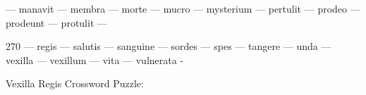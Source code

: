 \documentclass[12pt]{article}
\begin{document}
\pagestyle{fancy}
\fancyhf{}
\renewcommand{\headrulewidth}{0pt}
\renewcommand{\footrulewidth}{0pt}
\libertine
\renewcommand\PuzzleClueFont{\rm\normalsize}
\noindent\begin{rotate}{0}
\small 
\qquad --- manavit --- membra --- morte --- mucro --- mysterium --- pertulit --- prodeo --- prodeunt --- protulit --- 
\end{rotate}
\hfill
\begin{rotate}{270}
\small
\qquad --- regis --- salutis --- sanguine --- sordes --- spes --- tangere --- unda --- vexilla --- vexillum --- vita --- vulnerata -
\end{rotate}
\begin{center}
  \huge{Vexilla Regis Crossword Puzzle:}
\end{center}
\vspace{1.5cm}
\end{document}
